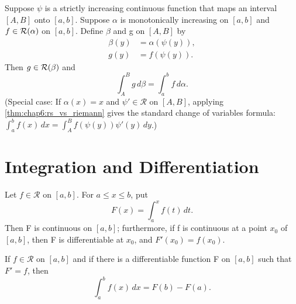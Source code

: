 \begin{theorem} %
  \label{thm:chap6:change_variable}
  Suppose $\psi$ is a strictly increasing continuous function that
  maps an interval $[A, B]$ onto $[a, b]$. Suppose $\alpha$ is
  monotonically increasing on $[a, b]$ and $f \in
  \mathcal{R}(\alpha)$ on $[a, b]$. Define $\beta$ and g on $[A, B]$ by
  \begin{align}
    \beta(y) &= \alpha(\psi(y)), \label{eq:chap6:beta_change_var} \\
    g(y) &= f(\psi(y)). \label{eq:chap6:g_change_var}
  \end{align}
  Then $g \in \mathcal{R}(\beta)$ and
  \begin{equation} \label{eq:chap6:change_var_result}
    \int_A^B g \, d\beta = \int_a^b f \, d\alpha.
  \end{equation}
  (Special case: If $\alpha(x)=x$ and $\psi' \in \mathcal{R}$ on $[A,
    B]$, applying \autoref{thm:chap6:rs_vs_riemann} gives the standard
    change of variables formula: $\int_a^b f(x) \, dx = \int_A^B
  f(\psi(y))\psi'(y) \, dy$.)
\end{theorem}

\section{Integration and Differentiation}
\label{sec:chap6:integration_differentiation}


\begin{theorem} %
  \label{thm:chap6:ftc1}
  Let $f \in \mathcal{R}$ on $[a, b]$. For $a \le x \le b$, put
  \[ F(x) = \int_a^x f(t) \, dt. \]
  Then F is continuous on $[a, b]$; furthermore, if f is continuous
  at a point $x_0$ of $[a, b]$, then F is differentiable at $x_0$,
  and $F'(x_0) = f(x_0)$.
\end{theorem}

\begin{theorem} %
  \label{thm:chap6:ftc2}
  If $f \in \mathcal{R}$ on $[a, b]$ and if there is a differentiable
  function F on $[a, b]$ such that $F' = f$, then
  \[ \int_a^b f(x) \, dx = F(b) - F(a). \]
\end{theorem}

